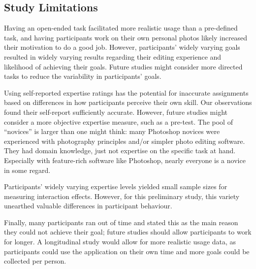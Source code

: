 \subsection{Study Limitations}
Having an open-ended task facilitated more realistic usage than a pre-defined task, and having participants work on their own personal photos likely increased their motivation to do a good job. However, participants' widely varying goals resulted in widely varying results regarding their editing experience and likelihood of achieving their goals. Future studies might consider more directed tasks to reduce the variability in participants' goals. 

Using self-reported expertise ratings has the potential for inaccurate assignments based on differences in how participants perceive their own skill. Our observations found their self-report sufficiently accurate. However, future studies might consider a more objective expertise measure, such as a pre-test. The pool of ``novices'' is larger than one might think: many Photoshop novices were experienced with photography principles and/or simpler photo editing software. They had domain knowledge, just not expertise on the specific task at hand. Especially with feature-rich software like Photoshop, nearly everyone is a novice in some regard. 

Participants' widely varying expertise levels yielded small sample sizes for measuring interaction effects. However, for this preliminary study, this variety unearthed valuable differences in participant behaviour. 

Finally, many participants ran out of time and stated this as the main reason they could not achieve their goal; future studies should allow participants to work for longer. A longitudinal study would allow for more realistic usage data, as participants could use the application on their own time and more goals could be collected per person. 
